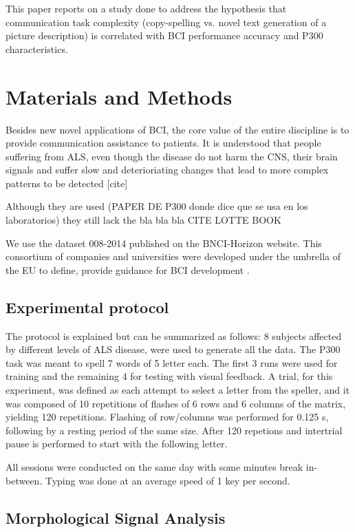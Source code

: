 \documentclass[entropy,article,submit,moreauthors,pdftex,10pt,a4paper]{mdpi}
\begin{document}
This paper reports on a study done to address
the hypothesis that communication task complexity
(copy-spelling vs. novel text generation of a picture
description) is correlated with BCI performance accuracy
and P300 characteristics.




\section{Materials and Methods}

Besides new novel applications of BCI, the core value of the entire discipline is to provide communication assistance to patients.  It is understood that people suffering from ALS, even though the disease do not harm the CNS, their brain signals and suffer slow and deterioriating changes that lead to more complex patterns to be detected [cite]

Although they are used (PAPER DE P300 donde dice que se usa en los laboratorios) they still lack the bla bla bla CITE LOTTE BOOK \citep{Huggins2016}

We use the dataset 008-2014 published on the BNCI-Horizon website.  This consortium of companies and universities were developed under the umbrella of the EU to define, provide guidance for BCI development \citep{Riccio2013}.

\subsection{Experimental protocol}

The protocol is explained \citep{Riccio2013} but can be summarized as follows:  8 subjects affected by different levels of ALS disease, were used to generate all the data. The P300 task was meant to spell 7 words of 5 letter each.  The first 3 runs were used for training and the remaining 4 for testing with visual feedback.  A trial, for this experiment, was defined as each attempt to select a letter from the speller, and it was composed of 10 repetitions of flashes of 6 rows and 6 columns of the matrix, yielding 120 repetitions.  Flashing of row/columns was performed for 0.125 s, following by a resting period of the same size.  After 120 repetions and intertrial pause is performed to start with the following letter.

All sessions were conducted on the same day with some minutes break in-between. Typing was done at an average speed of 1 key per second.  

\subsection{Morphological Signal Analysis}
\end{document}
